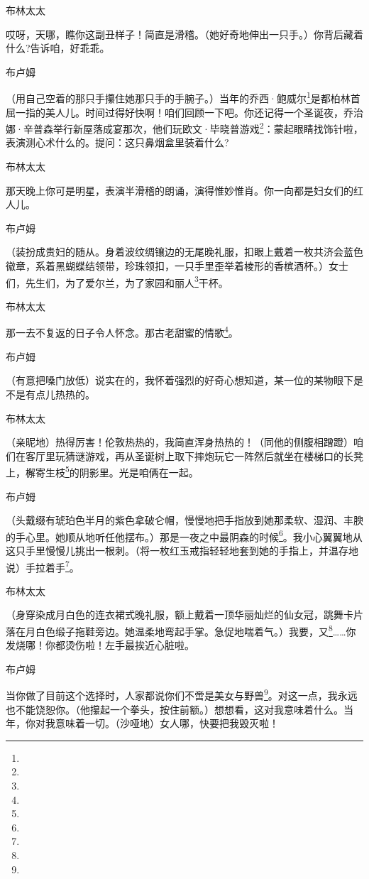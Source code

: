 \par 布林太太
\par 哎呀，天哪，瞧你这副丑样子！简直是滑稽。（她好奇地伸出一只手。）你背后藏着什么?告诉咱，好乖乖。
\par 布卢姆
\par （用自己空着的那只手攥住她那只手的手腕子。）当年的乔西·鲍威尔\footnote{}是都柏林首屈一指的美人儿。时间过得好快啊！咱们回顾一下吧。你还记得一个圣诞夜，乔治娜·辛普森举行新屋落成宴那次，他们玩欧文·毕晓普游戏\footnote{}：蒙起眼睛找饰针啦，表演测心术什么的。提问：这只鼻烟盒里装着什么?
\par 布林太太
\par 那天晚上你可是明星，表演半滑稽的朗诵，演得惟妙惟肖。你一向都是妇女们的红人儿。
\par 布卢姆
\par （装扮成贵妇的随从。身着波纹绸镶边的无尾晚礼服，扣眼上戴着一枚共济会蓝色徽章，系着黑蝴蝶结领带，珍珠领扣，一只手里歪举着棱形的香槟酒杯。）女士们，先生们，为了爱尔兰，为了家园和丽人\footnote{}干杯。
\par 布林太太
\par 那一去不复返的日子令人怀念。那古老甜蜜的情歌\footnote{}。
\par 布卢姆
\par （有意把嗓门放低）说实在的，我怀着强烈的好奇心想知道，某一位的某物眼下是不是有点儿热热的。
\par 布林太太
\par （亲昵地）热得厉害！伦敦热热的，我简直浑身热热的！（同他的侧腹相蹭蹬）咱们在客厅里玩猜谜游戏，再从圣诞树上取下摔炮玩它一阵然后就坐在楼梯口的长凳上，檞寄生枝\footnote{}的阴影里。光是咱俩在一起。
\par 布卢姆
\par （头戴缀有琥珀色半月的紫色拿破仑帽，慢慢地把手指放到她那柔软、湿润、丰腴的手心里。她顺从地听任他摆布。）那是一夜之中最阴森的时候\footnote{}。我小心翼翼地从这只手里慢慢儿挑出一根刺。（将一枚红玉戒指轻轻地套到她的手指上，并温存地说）手拉着手\footnote{}。
\par 布林太太
\par （身穿染成月白色的连衣裙式晚礼服，额上戴着一顶华丽灿烂的仙女冠，跳舞卡片落在月白色缎子拖鞋旁边。她温柔地弯起手掌。急促地喘着气。）我要，又\footnote{}……你发烧哪！你都烫伤啦！左手最挨近心脏啦。
\par 布卢姆
\par 当你做了目前这个选择时，人家都说你们不啻是美女与野兽\footnote{}。对这一点，我永远也不能饶恕你。（他攥起一个拳头，按住前额。）想想看，这对我意味着什么。当年，你对我意味着一切。（沙哑地）女人哪，快要把我毁灭啦！
